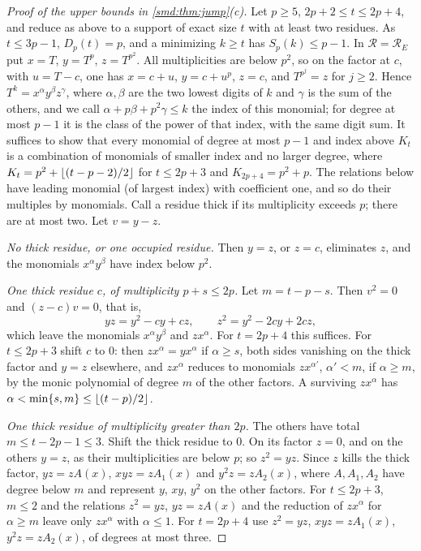 \begin{proof}[Proof of the upper bounds in \cref{smd:thm:jump}(c)]
Let $p\ge5$, $2p+2\le t\le2p+4$, and reduce as above to a support of exact size $t$ with at least
two residues. As $t\le3p-1$, $D_p(t)=p$, and a minimizing $k\ge t$ has $S_p(k)\le p-1$. In
$\mathcal R=\mathcal R_E$ put $x=T$, $y=T^p$, $z=T^{p^2}$. All multiplicities are below $p^2$, so
on the factor at $c$, with $u=T-c$, one has $x=c+u$, $y=c+u^p$, $z=c$, and $T^{p^j}=z$ for
$j\ge2$. Hence $T^k=x^\alpha y^\beta z^\gamma$, where $\alpha,\beta$ are the two lowest digits of
$k$ and $\gamma$ is the sum of the others, and we call $\alpha+p\beta+p^2\gamma\le k$ the index of
this monomial; for degree at most $p-1$ it is the class of the power of that index, with the same
digit sum. It suffices to show that every monomial of degree at most $p-1$ and index above $K_t$
is a combination of monomials of smaller index and no larger degree, where
$K_t=p^2+\lfloor(t-p-2)/2\rfloor$ for $t\le2p+3$ and $K_{2p+4}=p^2+p$. The relations below have leading
monomial (of largest index) with coefficient one, and so do their multiples by monomials. Call a
residue thick if its multiplicity exceeds $p$; there are at most two. Let $v=y-z$.

\emph{No thick residue, or one occupied residue.} Then $y=z$, or $z=c$, eliminates $z$, and the
monomials $x^\alpha y^\beta$ have index below $p^2$.

\emph{One thick residue $c$, of multiplicity $p+s\le2p$.} Let $m=t-p-s$. Then $v^2=0$ and
$(z-c)v=0$, that is,
\[
 yz=y^2-cy+cz,\qquad z^2=y^2-2cy+2cz,
\]
which leave the monomials $x^\alpha y^\beta$ and $zx^\alpha$. For $t=2p+4$ this suffices. For
$t\le2p+3$ shift $c$ to $0$: then $zx^\alpha=yx^\alpha$ if $\alpha\ge s$, both sides vanishing on
the thick factor and $y=z$ elsewhere, and $zx^\alpha$ reduces to monomials $zx^{\alpha'}$,
$\alpha'<m$, if $\alpha\ge m$, by the monic polynomial of degree $m$ of the other factors. A
surviving $zx^\alpha$ has $\alpha<\min\{s,m\}\le\lfloor(t-p)/2\rfloor$.

\emph{One thick residue of multiplicity greater than $2p$.} The others have total $m\le t-2p-1\le3$.
Shift the thick residue to $0$. On its factor $z=0$, and on the others $y=z$, as their
multiplicities are below $p$; so $z^2=yz$. Since $z$ kills the thick factor, $yz=zA(x)$,
$xyz=zA_1(x)$ and $y^2z=zA_2(x)$, where $A,A_1,A_2$ have degree below $m$ and represent $y$, $xy$,
$y^2$ on the other factors. For $t\le2p+3$, $m\le2$ and the relations $z^2=yz$, $yz=zA(x)$ and the
reduction of $zx^\alpha$ for $\alpha\ge m$ leave only $zx^\alpha$ with $\alpha\le1$. For
$t=2p+4$ use $z^2=yz$, $xyz=zA_1(x)$, $y^2z=zA_2(x)$, of degrees at most three.


\end{proof}
